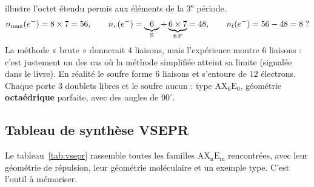 \documentclass[11pt,a4paper]{article}
\newcommand{\nmax}{n_{\max}(e^{-})}
\newcommand{\nv}{n_{v}(e^{-})}
\newcommand{\nl}{n_{l}(e^{-})}
\newcommand{\AX}[2]{\ensuremath{\mathrm{AX_{#1}E_{#2}}}}
\begin{document}
\begin{exemple}
 illustre l'octet étendu permis aux éléments de la 3\textsuperscript{e} période.
\[ \nmax = 8\times 7 = 56,\qquad \nv = \underbrace{6}_{\ce{S}} + \underbrace{6\times 7}_{6\,\ce{F}} = 48,
   \qquad \nl = 56 - 48 = 8\;? \]
La méthode « brute » donnerait $4$ liaisons, mais l'expérience montre $6$ liaisons  : c'est
justement un des cas où la méthode simplifiée atteint sa limite (signalée dans le livre). En
réalité le soufre forme $6$ liaisons et s'entoure de $12$ électrons. Chaque  porte $3$
doublets libres et le soufre aucun : type \AX{6}{0}, géométrie \textbf{octaédrique} parfaite, avec
des angles  de $90^\circ$.
\end{exemple}

\subsection{Tableau de synthèse VSEPR}

Le tableau~\ref{tab:vsepr} rassemble toutes les familles \AX{n}{m} rencontrées, avec leur
géométrie de répulsion, leur géométrie moléculaire et un exemple type. C'est l'outil à mémoriser.
\end{document}
